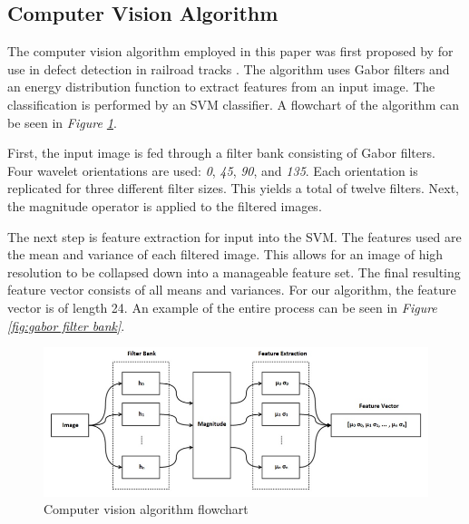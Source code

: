 \documentclass[letterpaper, 10 pt, conference]{ieeeconf}  %
\begin{document}
\subsection{Computer Vision Algorithm}

The computer vision algorithm employed in this paper was first proposed by for use in defect detection in railroad tracks \cite{railDefect}. The algorithm uses Gabor filters and an energy distribution function to extract features from an input image. The classification is performed by an SVM classifier. A flowchart of the algorithm can be seen in \textit{Figure \ref{fig:vision algorithm diagram}}.

First, the input image is fed through a filter bank consisting of Gabor filters. Four wavelet orientations are used: \textit{0\degree}, \textit{45\degree}, \textit{90\degree}, and \textit{135\degree}. Each orientation is replicated for three different filter sizes. This yields a total of twelve filters. Next, the magnitude operator is applied to the filtered images. 

The next step is feature extraction for input into the SVM. The features used are the mean and variance of each filtered image. This allows for an image of high resolution to be collapsed down into a manageable feature set. The final resulting feature vector consists of all means and variances. For our algorithm, the feature vector is of length 24. An example of the entire process can be seen in \textit{Figure \ref{fig:gabor filter bank}}.

\begin{figure}
    \centering
    \includegraphics[width=.75\textwidth]{computer_vision_diagram.png}
    \caption{Computer vision algorithm flowchart}
    \vspace*{2mm}
    \label{fig:vision algorithm diagram}
\end{figure}
\end{document}
